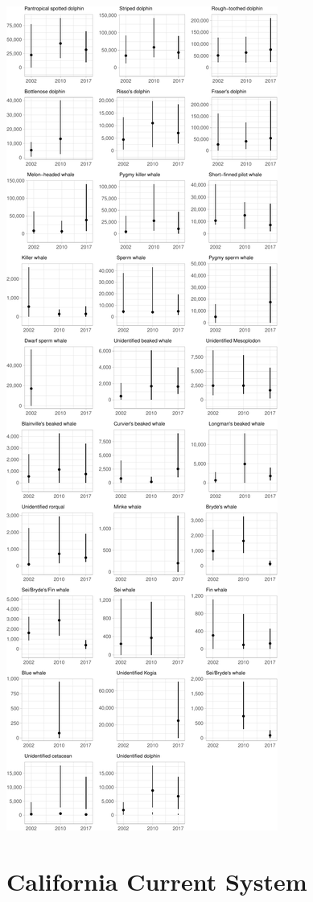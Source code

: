 \documentclass[
]{book}
\begin{document}
\includegraphics{figures/unnamed-chunk-365-1.pdf}

\hypertarget{california-current-system}{%
\chapter{California Current System}\label{california-current-system}}
\end{document}
